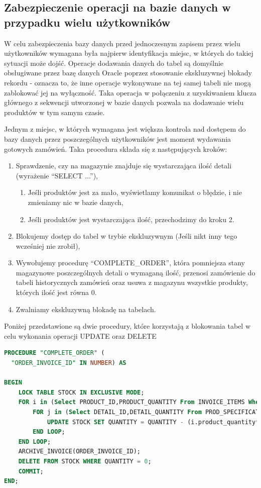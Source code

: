 \documentclass{article}
\begin{document}
\subsection{Zabezpieczenie operacji na bazie danych w przypadku wielu użytkowników}
W celu zabezpieczenia bazy danych przed jednoczesnym zapisem przez wielu
użytkowników wymagana była najpierw identyfikacja miejsc, w których do takiej sytuacji
może dojść. Operacje dodawania danych do tabel są domyślnie obsługiwane przez
bazę danych Oracle poprzez stosowanie ekskluzywnej blokady rekordu - oznacza to,
że inne operacje wykonywane na tej samej tabeli nie mogą zablokować jej na
wyłączność. Taka operacja w połączeniu z uzyskiwaniem klucza głównego z
sekwencji utworzonej w bazie danych pozwala na dodawanie wielu produktów w tym
samym czasie.

Jednym z miejsc, w których wymagana jest większa kontrola nad dostępem do bazy
danych przez poszczególnych użytkowników jest moment wydawania gotowych
zamówień. Taka procedura składa się z następujących kroków:
\begin{enumerate}
   \item Sprawdzenie, czy na magazynie znajduje się wystarczająca ilość detali
         (wyrażenie ``SELECT ...''),
         \begin{enumerate}
            \item Jeśli produktów jest za mało, wyświetlamy komunikat o błędzie, i nie zmieniamy nic w bazie danych,
            \item Jeśli produktów jest wystarczająca ilość, przechodzimy do kroku 2.
         \end{enumerate}
   \item Blokujemy dostęp do tabel w trybie ekskluzywnym (Jeśli nikt inny tego wcześniej nie zrobił),
   \item Wywołujemy procedurę ``COMPLETE\_ORDER'', która pomniejsza stany
         magazynowe poszczególnych detali o wymaganą ilość, przenosi zamówienie do tabeli historycznych zamówień oraz usuwa z magazynu wszystkie produkty, których ilość jest równa 0.
   \item Zwalniamy ekskluzywną blokadę na tabelach.
\end{enumerate}
Poniżej przedstawione są dwie procedury, które korzystają z blokowania tabel w
celu wykonania operacji UPDATE oraz DELETE
\begin{lstlisting}[language=sql, frame=single,tabsize=1,breaklines=true,caption={Procedura COMPLETE\_ORDER}]
   PROCEDURE "COMPLETE_ORDER" (
  "ORDER_INVOICE_ID" IN NUMBER) AS

BEGIN 
	LOCK TABLE STOCK IN EXCLUSIVE MODE;
	FOR i in (Select PRODUCT_ID,PRODUCT_QUANTITY From INVOICE_ITEMS Where Invoice_ID=ORDER_INVOICE_ID) LOOP
		FOR j in (Select DETAIL_ID,DETAIL_QUANTITY From PROD_SPECIFICATION Where PRODUCT_ID = i.product_id) LOOP
			UPDATE STOCK SET QUANTITY = QUANTITY - (i.product_quantity*j.detail_quantity) Where DETAIL_ID=j.detail_id;
		END LOOP;
	END LOOP;
    ARCHIVE_INVOICE(ORDER_INVOICE_ID);
	DELETE FROM STOCK WHERE QUANTITY = 0;
	COMMIT;
END;
\end{lstlisting}
\end{document}
